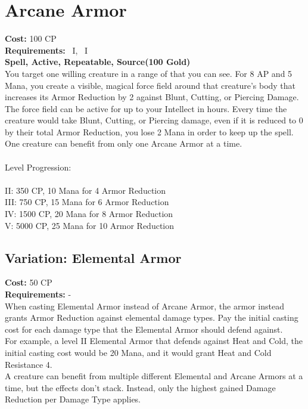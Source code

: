 \section{Arcane Armor}\label{spell:arcaneArmor}
\textbf{Cost:} 100 CP\\
\textbf{Requirements:}~ I,~ I\\
\textbf{Spell, Active, Repeatable, Source(100 Gold)}\\
You target one willing creature in a range of  that you can see.
For 8 AP and 5 Mana, you create a visible, magical force field around that creature's body that increases its Armor Reduction by 2 against Blunt, Cutting, or Piercing Damage.
The force field can be active for up to your Intellect in hours.
Every time the creature would take Blunt, Cutting, or Piercing damage, even if it is reduced to 0 by their total Armor Reduction, you lose 2 Mana in order to keep up the spell.
One creature can benefit from only one Arcane Armor at a time.\\
\\
Level Progression:\\
\\
II: 350 CP, 10 Mana for 4 Armor Reduction\\
III: 750 CP, 15 Mana for 6 Armor Reduction\\
IV: 1500 CP, 20 Mana for 8 Armor Reduction\\
V: 5000 CP, 25 Mana for 10 Armor Reduction\\

\subsection{Variation: Elemental Armor}\label{spell:elementalArmor}
\textbf{Cost:} 50 CP\\
\textbf{Requirements:} -\\
When casting Elemental Armor instead of Arcane Armor, the armor instead grants Armor Reduction against elemental damage types.
Pay the initial casting cost for each damage type that the Elemental Armor should defend against.\\
For example, a level II Elemental Armor that defends against Heat and Cold, the initial casting cost would be 20 Mana, and it would grant Heat and Cold Resistance 4.\\
A creature can benefit from multiple different Elemental and Arcane Armors at a time, but the effects don't stack.
Instead, only the highest gained Damage Reduction per Damage Type applies.